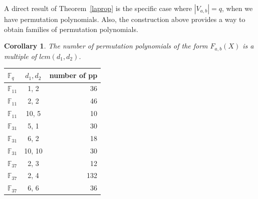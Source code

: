 \documentclass[landscape,final,paperwidth=48in,paperheight=36in]{baposter}
\newtheorem{corollary}{Corollary}
\begin{document}
\begin{poster}
{A direct result of Theorem~\ref{laprop} is the specific case where $|V_{a, b}| = q$, when we have permutation polynomials. Also, the construction above provides a way to obtain families of permutation polynomials.

  \begin{corollary}
    The number of permutation polynomials of the form $F_{a, b}(X)$ is a multiple of $lcm(d_1,d_2)$.
  \end{corollary}

  \begin{center}
    \begin{tabular}{ | l | c || r | }
      \hline 
      $\mathbb{F}_q$  & $d_1, d_2$ & number of pp \\
      \hline
      $\mathbb{F}_{11}$ &    1, 2    &  36 \\
      $\mathbb{F}_{11}$ &    2, 2    &  46 \\
      $\mathbb{F}_{11}$ &   10, 5    &  10 \\  
      \hline
      $\mathbb{F}_{31}$ &    5, 1    &  30 \\
      $\mathbb{F}_{31}$ &    6, 2    &  18 \\
      $\mathbb{F}_{31}$ &   10, 10   &  30 \\
      \hline                   
      $\mathbb{F}_{37}$ &    2, 3    &  12 \\
      $\mathbb{F}_{37}$ &    2, 4    &  132 \\
      $\mathbb{F}_{37}$ &    6, 6    &  36 \\
      \hline 
    \end{tabular}
  \end{center}

  }\label{Future Work}

\label{Applications}



\end{poster}
\end{document}
